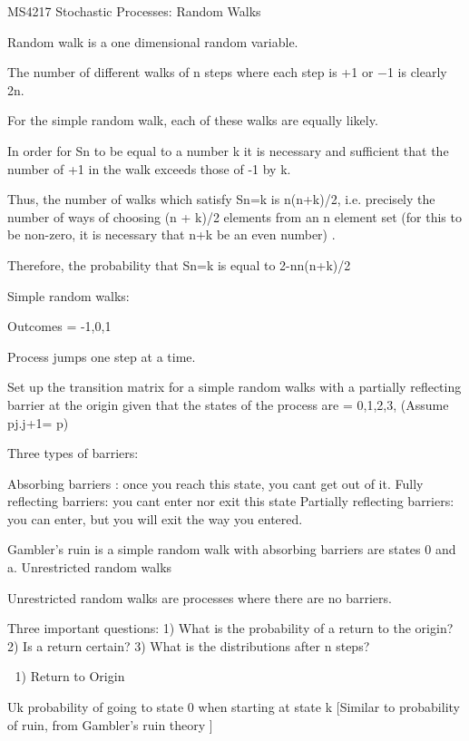 MS4217 Stochastic Processes: Random Walks
 
  
Random walk is a one dimensional random variable.
 
The number of different walks of n steps where each step is +1 or −1 is clearly 2n.
 
For the simple random walk, each of these walks are equally likely.
 
In order for Sn to be equal to a number k it is necessary and sufficient that the number of +1 in the walk exceeds those of -1 by k.
 
Thus, the number of walks which satisfy Sn=k is n(n+k)/2, i.e. precisely the number of ways of choosing (n + k)/2 elements from an n element set (for this to be non-zero, it is necessary that n+k be an even number) .
 
Therefore, the probability that Sn=k is equal to 2-nn(n+k)/2

 

Simple random walks: 

Outcomes ={ -1,0,1}

Process jumps one step at a time.

Set up the transition matrix for a simple random walks with a partially reflecting barrier at the origin given that the states of the 
process are ={ 0,1,2,3,} (Assume pj.j+1= p)

Three types of barriers:

Absorbing barriers : once you reach this state, you cant get out of it.
Fully reflecting barriers:  you cant enter nor exit this state
Partially reflecting barriers: you can enter, but you will exit the way you entered.

Gambler's ruin is a simple random walk with absorbing barriers are states 0 and a.
Unrestricted random walks

Unrestricted random walks are processes where there are no barriers.

Three important questions:
	1) What is the probability of a return to the origin?
	2) Is a return certain?
	3) What is the distributions after n steps?






1) Return to Origin

Uk	probability of going to state 0 when starting at state k 
	[Similar to probability of ruin, from Gambler's ruin theory ]


